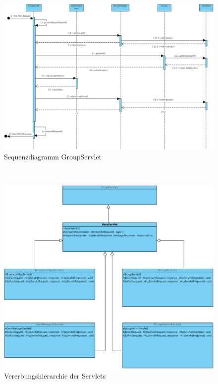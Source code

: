 \begin{figure}[h]
     \centering
     \hspace*{-2cm}\includegraphics[scale=0.5, trim=2 2 2 2, clip=true]{servergraphs/sequenz-server.pdf}
     \caption{Sequenzdiagramm GroupServlet}
\end{figure}
\clearpage
\\
\begin{figure}[h]
     \centering
     \hspace*{-2.9cm}\includegraphics[scale=0.7]{servergraphs/servlets.pdf}
     \caption{Vererbungshierarchie der Servlets}
\end{figure}
\clearpage
